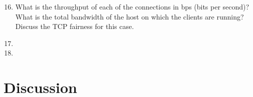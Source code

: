 \documentclass[10pt]{article}
\begin{document}
\begin{enumerate}
  \setcounter{enumi}{15}
  \item{What is the throughput of each of the connections in bps (bits per second)? What is the total bandwidth of the host on which the clients are running? Discuss the TCP fairness for this case.}
  \item{}
  \subitem{}
  \item{}
  \subitem{}
\end{enumerate}





\section{Discussion}
\end{document}

